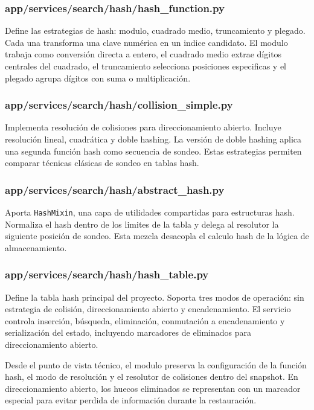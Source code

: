 \documentclass[12pt,onecolumn]{IEEEtran}
\begin{document}
\subsubsection{app/services/search/hash/hash\_function.py}
Define las estrategias de hash: modulo, cuadrado medio, truncamiento y plegado. Cada una transforma una clave numérica en un indice candidato. El modulo trabaja como conversión directa a entero, el cuadrado medio extrae dígitos centrales del cuadrado, el truncamiento selecciona posiciones especificas y el plegado agrupa dígitos con suma o multiplicación.

\subsubsection{app/services/search/hash/collision\_simple.py}
Implementa resolución de colisiones para direccionamiento abierto. Incluye resolución lineal, cuadrática y doble hashing. La versión de doble hashing aplica una segunda función hash como secuencia de sondeo. Estas estrategias permiten comparar técnicas clásicas de sondeo en tablas hash.

\subsubsection{app/services/search/hash/abstract\_hash.py}
Aporta \texttt{HashMixin}, una capa de utilidades compartidas para estructuras hash. Normaliza el hash dentro de los limites de la tabla y delega al resolutor la siguiente posición de sondeo. Esta mezcla desacopla el calculo hash de la lógica de almacenamiento.

\subsubsection{app/services/search/hash/hash\_table.py}
Define la tabla hash principal del proyecto. Soporta tres modos de operación: sin estrategia de colisión, direccionamiento abierto y encadenamiento. El servicio controla inserción, búsqueda, eliminación, conmutación a encadenamiento y serialización del estado, incluyendo marcadores de eliminados para direccionamiento abierto.

Desde el punto de vista técnico, el modulo preserva la configuración de la función hash, el modo de resolución y el resolutor de colisiones dentro del snapshot. En direccionamiento abierto, los huecos eliminados se representan con un marcador especial para evitar perdida de información durante la restauración.
\end{document}
